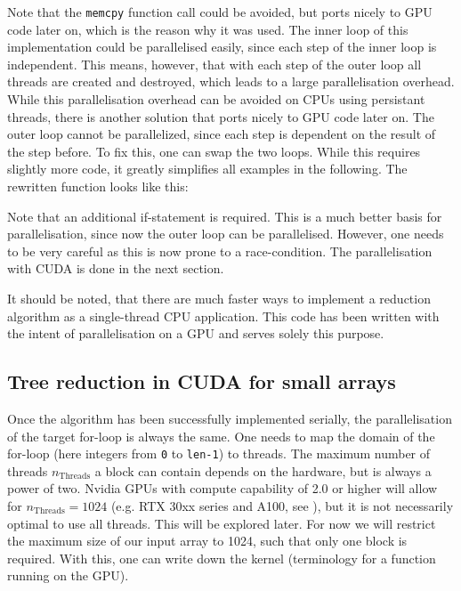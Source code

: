 

Note that the \texttt{memcpy} function call could be avoided, but ports nicely to GPU code later on, which is the reason why it was used.
The inner loop of this implementation could be parallelised easily, since each step of the inner loop is independent.
This means, however, that with each step of the outer loop all threads are created and destroyed, which leads to a large parallelisation overhead.
While this parallelisation overhead can be avoided on CPUs using persistant threads, there is another solution that ports nicely to GPU code later on.
The outer loop cannot be parallelized, since each step is dependent on the result of the step before.
To fix this, one can swap the two loops.
While this requires slightly more code, it greatly simplifies all examples in the following.
The rewritten function looks like this:



Note that an additional if-statement is required.
This is a much better basis for parallelisation, since now the outer loop can be parallelised.
However, one needs to be very careful as this is now prone to a race-condition.
The parallelisation with CUDA is done in the next section.

It should be noted, that there are much faster ways to implement a reduction algorithm as a single-thread CPU application.
This code has been written with the intent of parallelisation on a GPU and serves solely this purpose.

\subsection{Tree reduction in CUDA for small arrays}
Once the algorithm has been successfully implemented serially, the parallelisation of the target for-loop is always the same.
One needs to map the domain of the for-loop (here integers from \texttt{0} to \texttt{len-1}) to threads.
The maximum number of threads \( n_{\mathrm{Threads}} \) a block can contain depends on the hardware, but is always a power of two.
Nvidia GPUs with compute capability of 2.0 or higher will allow for \( n_{\mathrm{Threads}} = 1024 \) (e.g. RTX 30xx series and A100, see \cite{programming_guide}), but it is not necessarily optimal to use all threads.
This will be explored later.
For now we will restrict the maximum size of our input array to 1024, such that only one block is required.
With this, one can write down the kernel (terminology for a function running on the GPU).

